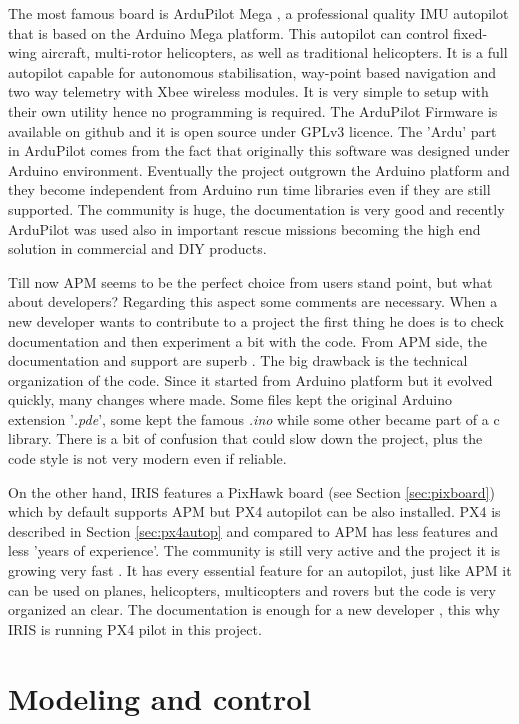The most famous board is ArduPilot Mega \cite{ArduP}, a professional quality IMU autopilot that is based on the Arduino Mega platform.  This autopilot can control fixed-wing aircraft, multi-rotor helicopters, as well as traditional helicopters.  It is a full autopilot capable for autonomous stabilisation, way-point based navigation and two way telemetry with Xbee wireless modules. It is very simple to setup with their own utility hence no programming is required. The ArduPilot Firmware \cite{APM} is available on github and it is open source under GPLv3 licence. The 'Ardu' part in ArduPilot comes from the fact that originally this software was designed under Arduino environment. Eventually the project outgrown the Arduino platform and they become independent from Arduino run time libraries even if they are still supported. The community is huge, the documentation is very good and recently ArduPilot was used also in important rescue missions becoming the high end solution in commercial and DIY products.\par Till now APM seems to be the perfect choice from users stand point, but what about developers? Regarding this aspect some comments are necessary. When a new developer wants to contribute to a project the first thing he does is to check documentation and then experiment a bit with the code. From APM side, the documentation and support are superb \cite{APM}. The big drawback is the technical organization of the code. Since it started from Arduino platform but it evolved quickly, many changes where made. Some files kept the original Arduino extension '\textit{.pde}', some kept the famous \textit{.ino} while some other became part of a c library. There is a bit of confusion that could slow down the project, plus the code style is not very modern even if reliable.

On the other hand, IRIS features a PixHawk board (see Section \ref{sec:pixboard}) which by default supports APM but PX4 autopilot can be also installed. PX4 \cite{PX4} is  described in Section \ref{sec:px4autop} and compared to APM has less features and less 'years of experience'. The community is still very active and the project it is growing very fast \cite{PX4Git}. It has every essential feature for an autopilot, just like APM it can be used on planes, helicopters, multicopters and rovers but the code is very organized an clear. The documentation is enough for a new developer , this why IRIS is running PX4 pilot in this project.

\section{Modeling and control}

